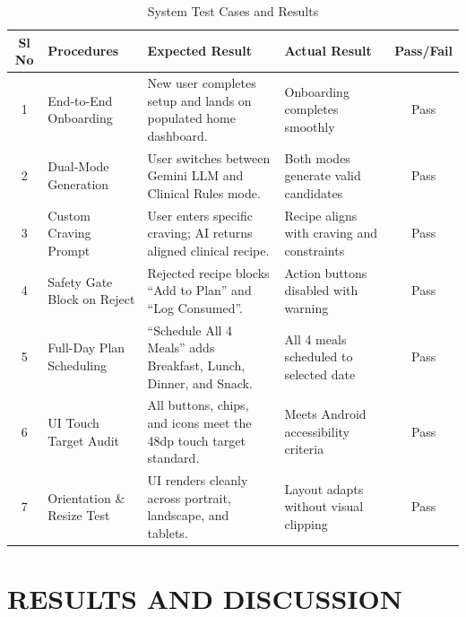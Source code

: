 \documentclass[a4paper,12pt]{report}
\begin{document}
\begin{table}[H]
\centering
\begin{tabular}{|c|p{3.2cm}|p{4.4cm}|p{4.4cm}|c|}
\hline
\textbf{Sl No} & \textbf{Procedures} & \textbf{Expected Result} & \textbf{Actual Result} & \textbf{Pass/Fail} \\
\hline \hline
1 & End-to-End Onboarding & New user completes setup and lands on populated home dashboard. & Onboarding completes smoothly & Pass \\
\hline
2 & Dual-Mode Generation & User switches between Gemini LLM and Clinical Rules mode. & Both modes generate valid candidates & Pass \\
\hline
3 & Custom Craving Prompt & User enters specific craving; AI returns aligned clinical recipe. & Recipe aligns with craving and constraints & Pass \\
\hline
4 & Safety Gate Block on Reject & Rejected recipe blocks ``Add to Plan'' and ``Log Consumed''. & Action buttons disabled with warning & Pass \\
\hline
5 & Full-Day Plan Scheduling & ``Schedule All 4 Meals'' adds Breakfast, Lunch, Dinner, and Snack. & All 4 meals scheduled to selected date & Pass \\
\hline
6 & UI Touch Target Audit & All buttons, chips, and icons meet the 48dp touch target standard. & Meets Android accessibility criteria & Pass \\
\hline
7 & Orientation \& Resize Test & UI renders cleanly across portrait, landscape, and tablets. & Layout adapts without visual clipping & Pass \\
\hline
\end{tabular}
\caption{System Test Cases and Results}
\end{table}

\chapter{RESULTS AND DISCUSSION}
\end{document}
